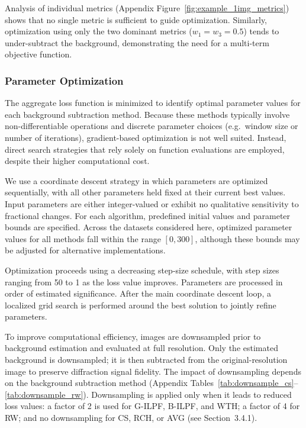 \documentclass[iucr]{iucrjournals}
\begin{document}
Analysis of individual metrics (Appendix Figure~\ref{fig:example_1img_metrics}) shows that no single metric is sufficient to guide optimization. Similarly, optimization using only the two dominant metrics ($w_1 = w_3 = 0.5$) tends to under-subtract the background, demonstrating the need for a multi-term objective function.




\subsubsection{Parameter Optimization}

The aggregate loss function is minimized to identify optimal parameter values for each background subtraction method. Because these methods typically involve non-differentiable operations and discrete parameter choices (e.g.\ window size or number of iterations), gradient-based optimization is not well suited. Instead, direct search strategies that rely solely on function evaluations are employed, despite their higher computational cost.

We use a coordinate descent strategy in which parameters are optimized sequentially, with all other parameters held fixed at their current best values. Input parameters are either integer-valued or exhibit no qualitative sensitivity to fractional changes. For each algorithm, predefined initial values and parameter bounds are specified. Across the datasets considered here, optimized parameter values for all methods fall within the range $[0, 300]$, although these bounds may be adjusted for alternative implementations.

Optimization proceeds using a decreasing step-size schedule, with step sizes ranging from 50 to 1 as the loss value improves. Parameters are processed in order of estimated significance. After the main coordinate descent loop, a localized grid search is performed around the best solution to jointly refine parameters.

To improve computational efficiency, images are downsampled prior to background estimation and evaluated at full resolution. Only the estimated background is downsampled; it is then subtracted from the original-resolution image to preserve diffraction signal fidelity. The impact of downsampling depends on the background subtraction method (Appendix Tables~\ref{tab:downsample_cs}--\ref{tab:downsample_rw}). Downsampling is applied only when it leads to reduced loss values: a factor of 2 is used for G-ILPF, B-ILPF, and WTH; a factor of 4 for RW; and no downsampling for CS, RCH, or AVG (see Section~3.4.1).
\end{document}
